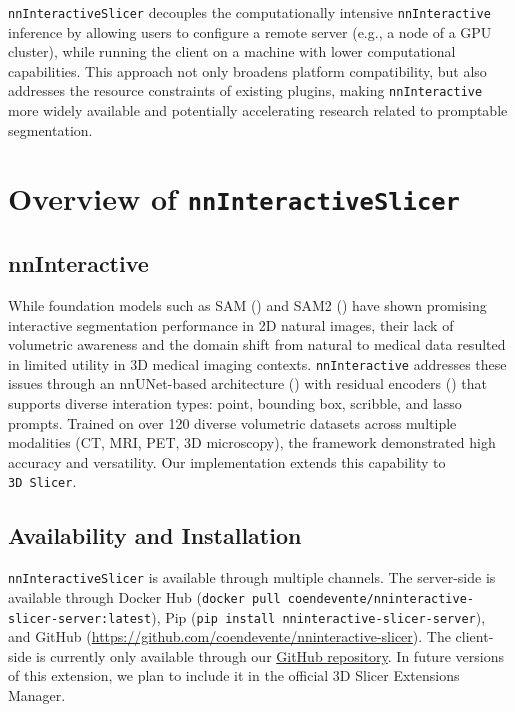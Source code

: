 \documentclass[
]{article}
\begin{document}
\texttt{nnInteractiveSlicer} decouples the computationally intensive
\texttt{nnInteractive} inference by allowing users to configure a remote
server (e.g., a node of a GPU cluster), while running the client on a
machine with lower computational capabilities. This approach not only
broadens platform compatibility, but also addresses the resource
constraints of existing plugins, making \texttt{nnInteractive} more
widely available and potentially accelerating research related to
promptable segmentation.

\section{\texorpdfstring{Overview of
\texttt{nnInteractiveSlicer}}{Overview of nnInteractiveSlicer}}\label{overview-of-nninteractiveslicer}

\subsection{nnInteractive}\label{nninteractive}

While foundation models such as SAM () and SAM2 () have shown promising interactive segmentation performance in
2D natural images, their lack of volumetric awareness and the domain
shift from natural to medical data resulted in limited utility in 3D
medical imaging contexts. \texttt{nnInteractive} addresses these issues
through an nnUNet-based architecture
() with residual
encoders () that
supports diverse interation types: point, bounding box, scribble, and
lasso prompts. Trained on over 120 diverse volumetric datasets across
multiple modalities (CT, MRI, PET, 3D microscopy), the framework
demonstrated high accuracy and versatility. Our implementation extends
this capability to \texttt{3D\ Slicer}.

\subsection{Availability and
Installation}\label{availability-and-installation}

\texttt{nnInteractiveSlicer} is available through multiple channels. The
server-side is available through Docker Hub
(\texttt{docker\ pull\ coendevente/nninteractive-slicer-server:latest}),
Pip (\texttt{pip\ install\ nninteractive-slicer-server}), and GitHub
(\url{https://github.com/coendevente/nninteractive-slicer}). The
client-side is currently only available through our
\href{https://github.com/coendevente/nninteractive-slicer}{GitHub
repository}. In future versions of this extension, we plan to include it
in the official 3D Slicer Extensions Manager.
\end{document}
